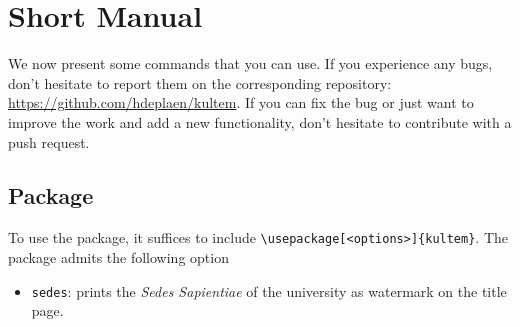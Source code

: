 \documentclass[oneside,a4paper,11pt,explicit]{book}
\begin{document}
\chapter{Short Manual}
\lstset{basicstyle=\ttfamily,breaklines=true}
We now present some commands that you can use. If you experience any bugs, don't hesitate to report them on the corresponding repository: \url{https://github.com/hdeplaen/kultem}. If you can fix the bug or just want to improve the work and add a new functionality, don't hesitate to contribute with a push request.
\section{Package}
To use the package, it suffices to include \verb|\usepackage[<options>]{kultem}|. The package admits the following option
\begin{itemize}
    \item \verb|sedes|: prints the \emph{Sedes Sapientiae} of the university as watermark on the title page.
\end{itemize}
\end{document}
